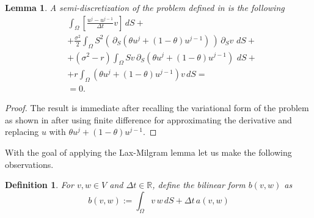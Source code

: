 \documentclass{article}
\newtheorem{df}{Definition}[section]
\newtheorem{lemma}[thm]{Lemma}
\newcommand{\argwrapsquare}[1]{\left[#1\right]}
\newcommand{\intS}[1]{\ensuremath{\int_{\Omega}#1 \, dS}}
\newcommand{\intSlong}[1]{\intS{\argwrapsquare{#1}}}
\newcommand{\darg}[2]{\ensuremath{\, \partial_{#2}#1} \, }
\newcommand{\dt}[1]{\ensuremath{\darg{#1}{t}}}
\newcommand{\dS}[1]{\ensuremath{\darg{#1}{S}}}
\newcommand{\dtu}{\dt{u}}
\newcommand{\dSv}{\dS{v}}
\newcommand{\sigmafrac}{\ensuremath{\frac{\sigma^2}{2}}}
\newcommand{\aform}[2]{\ensuremath{\sigmafrac \intS{S^2 \dS{#2} \dS{#1}} + (\sigma^2 - r) \intS{S #2 \dS{#1}} + \intS{r  #1  #2}}}
\newcommand{\auv}{\aform{u}{v}}
\begin{document}
\begin{lemma}\label{lemma:semi_discrete_prob}
    A semi-discretization of the problem defined in  is the following
     \begin{align*}
        &\intSlong{\frac{u^{j} - u^{j-1}}{\Delta t}  v} + \\
        &+\sigmafrac \intS{S^2 \left(\dS{\left(\theta u^{j} + (1- \theta) u^{j-1} \right)}\right) \dSv} + \\
        &+ (\sigma^2 - r) \intS{S v \dS{\left(\theta u^{j} + (1- \theta) u^{j-1} \right)}} + \\
        &+r \intS{\left(\theta u^{j} + (1- \theta) u^{j-1} \right)v} =\\
        &=0.
        \end{align*}
\end{lemma}
\begin{proof}
    The result is immediate after recalling the variational form of the problem as shown in  after using finite difference for approximating the derivative and replacing $u$ with $\theta u^{j} + (1- \theta) u^{j-1}$. \qedhere
    
\end{proof}
With the goal of applying the Lax-Milgram lemma  let us make the following observations.


\begin{df}\label{def:b}
    For $v,w \in V$ and $\Delta t \in \mathbb{R}$, define the bilinear form $b(v, w)$ as
    \begin{equation*}
        b(v, w) := \intS{v\,w} + \Delta t\,a(v,w)
    \end{equation*}
\end{df}
\end{document}
